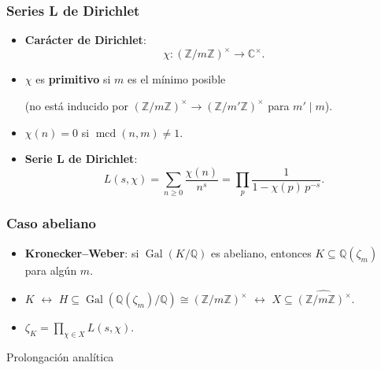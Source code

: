 \documentclass{beamer}
\newcommand{\ZZ}{\mathbb{Z}}
\newcommand{\QQ}{\mathbb{Q}}
\newcommand{\CC}{\mathbb{C}}
\DeclareMathOperator{\Gal}{Gal}
\renewcommand{\gcd}{\operatorname{mcd}}
\begin{document}

\begin{frame}
  \frametitle{Series L de Dirichlet}

  \begin{itemize}
  \item<1-> \textbf{Carácter de Dirichlet}:
    $$\chi\colon (\ZZ/m\ZZ)^\times \to \CC^\times.$$

  \item<2-> $\chi$ es \textbf{primitivo} si $m$ es el mínimo posible

    (no está inducido por $(\ZZ/m\ZZ)^\times \to (\ZZ/m'\ZZ)^\times$
    para $m' \mid m$).

  \item<3-> $\chi (n) = 0$ si $\gcd (n,m) \ne 1$.

  \item<4-> \textbf{Serie L de Dirichlet}:
    $$L (s,\chi) = \sum_{n \ge 0} \frac{\chi(n)}{n^s} = \prod_p \frac{1}{1 - \chi(p)\,p^{-s}}.$$
  \end{itemize}
\end{frame}


\begin{frame}
  \frametitle{Caso abeliano}

  \begin{itemize}
  \item<1-> \textbf{Kronecker--Weber}: si $\Gal (K/\QQ)$ es abeliano, entonces
    $K \subseteq \QQ (\zeta_m)$ para algún $m$.

  \item<2-> $K$ $\leftrightarrow$ $H \subseteq \Gal (\QQ (\zeta_m)/\QQ) \cong (\ZZ/m\ZZ)^\times$
     $\leftrightarrow$ $X \subseteq \widehat{(\ZZ/m\ZZ)^\times}$.

  \item<3-> $\zeta_K = \prod_{\chi \in X} L (s,\chi).$
  \end{itemize}
\end{frame}


\begin{frame}[plain]
  \headingfont

  \begin{center}
    {\huge Prolongación analítica}
  \end{center}
\end{frame}
\end{document}

